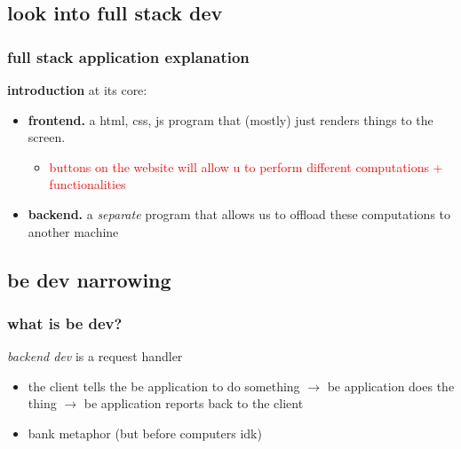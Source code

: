 \documentclass{beamer}
\begin{document}

\subsection{look into full stack dev}
\begin{frame}
\frametitle{full stack application explanation}
\begin{block}{\textbf{introduction}}
  at its core:
  \begin{itemize}
    \item \textbf{frontend.} a html, css, js program that (mostly) just
          renders things to the screen.
          \begin{itemize}
            \item \textcolor{red}{buttons on the website will allow u to perform different
                  computations + functionalities}
          \end{itemize}

    \item \textbf{backend.} a \textit{separate} program that allows us
          to offload these computations to another machine

  \end{itemize}

\end{block}
\end{frame}




\subsection{be dev narrowing}
\begin{frame}
\frametitle{what is be dev?}
\begin{block}{\textbf{}}
  \textit{backend dev} is a request handler
  \begin{itemize}
    \item the client tells the be application to do something $\rightarrow$
          be application does the thing $\rightarrow$ be application reports
          back to the client
    \item bank metaphor (but before computers idk)
  \end{itemize}
\end{block}

\end{frame}
\end{document}
